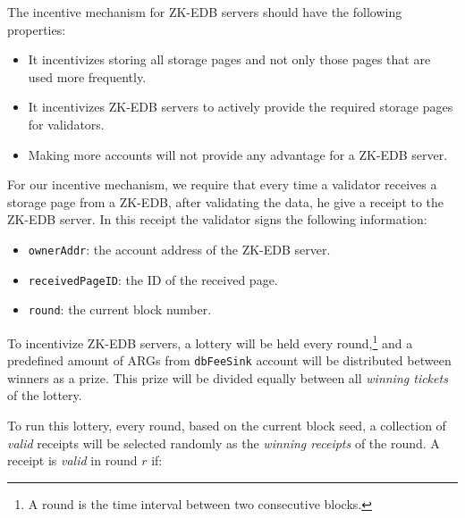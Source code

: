 The incentive mechanism for ZK-EDB servers should have the following properties:

\begin{itemize}
    \item It incentivizes storing all storage pages and not only those pages that are used more frequently.
    \item It incentivizes ZK-EDB servers to actively provide the required storage pages for validators.
    \item Making more accounts will not provide any advantage for a ZK-EDB server.
\end{itemize}

For our incentive mechanism, we require that every time a validator receives a storage page from a ZK-EDB, after
validating the data, he give a receipt to the ZK-EDB server. In this receipt the validator signs the
following information:

\begin{itemize}
    \item \texttt{ownerAddr}: the account address of the ZK-EDB server.
    \item \texttt{receivedPageID}: the ID of the received page.
    \item \texttt{round}: the current block number.
\end{itemize}


To incentivize ZK-EDB servers, a lottery will be held every round,\footnote{A round is the time interval between
two consecutive blocks.} and a predefined amount of ARGs from
\texttt{dbFeeSink} account will be distributed between winners as a prize. This prize will be divided equally
between all \emph{winning tickets} of the lottery.


To run this lottery, every round, based on the current block seed, a collection of \emph{valid} receipts will be
selected randomly as the \emph{winning receipts} of the round. A receipt is \emph{valid} in round $r$ if:

